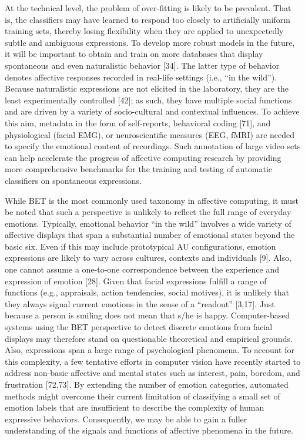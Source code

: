 \documentclass[10pt,letterpaper]{article}
\begin{document}
At the technical level, the problem of over-fitting is likely to be prevalent. That is, the classifiers may have learned to respond too closely to artificially uniform training sets, thereby losing flexibility when they are applied to unexpectedly subtle and ambiguous expressions. To develop more robust models in the future, it will be important to obtain and train on more databases that display spontaneous and even naturalistic behavior {[}34{]}. The latter type of behavior denotes affective responses recorded in real-life settings (i.e., ``in the wild''). Because naturalistic expressions are not elicited in the laboratory, they are the least experimentally controlled {[}42{]}; as such, they have multiple social functions and are driven by a variety of socio-cultural and contextual influences. To achieve this aim, metadata in the form of self-reports, behavioral coding {[}71{]}, and physiological (facial EMG), or neuroscientific measures (EEG, fMRI) are needed to specify the emotional content of recordings. Such annotation of large video sets can help accelerate the progress of affective computing research by providing more comprehensive benchmarks for the training and testing of automatic classifiers on spontaneous expressions.

While BET is the most commonly used taxonomy in affective computing, it must be noted that such a perspective is unlikely to reflect the full range of everyday emotions. Typically, emotional behavior ``in the wild'' involves a wide variety of affective displays that span a substantial number of emotional states beyond the basic six. Even if this may include prototypical AU configurations, emotion expressions are likely to vary across cultures, contexts and individuals {[}9{]}. Also, one cannot assume a one-to-one correspondence between the experience and expression of emotion {[}28{]}. Given that facial expressions fulfill a range of functions (e.g., appraisals, action tendencies, social motives), it is unlikely that they always signal current emotions in the sense of a ``readout'' {[}3,17{]}. Just because a person is smiling does not mean that s/he is happy. Computer-based systems using the BET perspective to detect discrete emotions from facial displays may therefore stand on questionable theoretical and empirical grounds. Also, expressions span a large range of psychological phenomena. To account for this complexity, a few tentative efforts in computer vision have recently started to address non-basic affective and mental states such as interest, pain, boredom, and frustration {[}72,73{]}. By extending the number of emotion categories, automated methods might overcome their current limitation of classifying a small set of emotion labels that are insufficient to describe the complexity of human expressive behaviors. Consequently, we may be able to gain a fuller understanding of the signals and functions of affective phenomena in the future.
\end{document}
